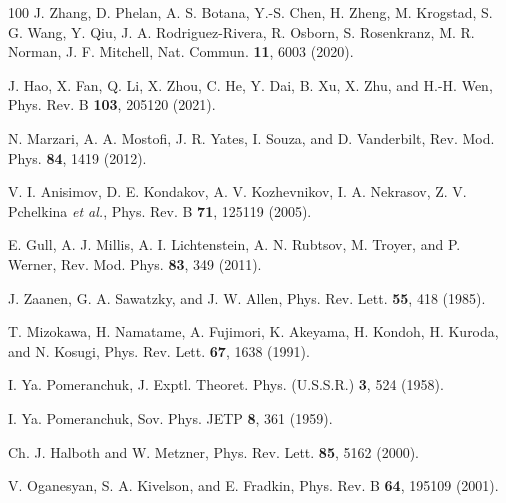\documentclass[prl,twocolumn,preprintnumbers,superscriptaddress]{revtex4-1}
\begin{document}
\begin{thebibliography}{100}
J. Zhang, D. Phelan, A. S. Botana, Y.-S. Chen, H. Zheng, M. Krogstad, S. G. Wang, Y. Qiu, J. A. Rodriguez-Rivera, R. Osborn, S. Rosenkranz, M. R. Norman, J. F. Mitchell, Nat. Commun. \textbf{11}, 6003 (2020).

J. Hao, X. Fan, Q. Li, X. Zhou, C. He, Y. Dai, B. Xu, X. Zhu, and H.-H. Wen, Phys. Rev. B \textbf{103}, 205120 (2021).


N. Marzari, A. A. Mostofi, J. R. Yates, I. Souza, and D. Vanderbilt, Rev. Mod. Phys. \textbf{84}, 1419 (2012).

V. I. Anisimov, D. E. Kondakov, A. V. Kozhevnikov, I. A. Nekrasov, Z. V. Pchelkina \emph{et al.}, Phys. Rev. B \textbf{71}, 125119 (2005).


E. Gull, A. J. Millis, A. I. Lichtenstein, A. N. Rubtsov, M. Troyer, and P. Werner, Rev. Mod. Phys. \textbf{83}, 349 (2011).

J. Zaanen, G. A. Sawatzky, and J. W. Allen, Phys. Rev. Lett. \textbf{55}, 418 (1985).

T. Mizokawa, H. Namatame, A. Fujimori, K. Akeyama, H. Kondoh, H. Kuroda, and N. Kosugi,
Phys. Rev. Lett. \textbf{67}, 1638 (1991).

I. Ya. Pomeranchuk,  J. Exptl. Theoret. Phys. (U.S.S.R.) \textbf{3}, 524 (1958).

I. Ya. Pomeranchuk, Sov. Phys. JETP \textbf{8}, 361 (1959).

Ch. J. Halboth and W. Metzner, Phys. Rev. Lett. \textbf{85}, 5162 (2000).

V. Oganesyan, S. A. Kivelson, and E. Fradkin, Phys. Rev. B \textbf{64}, 195109 (2001).


\end{thebibliography}
\end{document}
